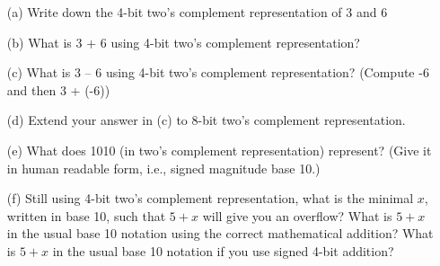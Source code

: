 \begin{enumerate}
  \item[(a)] Write down the 4-bit two’s complement representation of 3 and 6
  \item[(b)] What is 3 + 6 using 4-bit two’s complement representation?
  \item[(c)] What is 3 – 6 using 4-bit two’s complement representation? (Compute -6 and then 3 + (-6))
  \item[(d)] Extend your answer in (c) to 8-bit two’s complement representation.
  \item[(e)] What does 1010 (in two’s complement representation) represent? (Give it in human readable form, i.e., signed magnitude base 10.)
  \item[(f)] Still using 4-bit two's complement representation,
    what is the minimal $x$, written in base 10, such that
    $5 + x$ will give you an overflow?
    What is $5 + x$ in the usual base 10 notation using
    the correct mathematical addition?
    What is $5 + x$ in the usual base 10 notation if you use
    signed 4-bit addition?
\end{enumerate}

